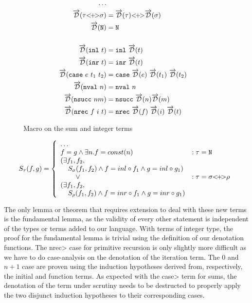   \begin{figure}
    \centering
    \begin{equation*}
      \begin{split}
        \dots \\
        \overrightarrow{\mathcal{D}}(\tau {<}\!{+}\!{>} \sigma) &= \overrightarrow{\mathcal{D}}(\tau) {<}\!{+}\!{>} \overrightarrow{\mathcal{D}}(\sigma) \\
        \overrightarrow{\mathcal{D}}(\texttt{N}) &= \texttt{N} \\ \\
        \overrightarrow{\mathcal{D}}(\texttt{inl}\ t) &= \texttt{inl}\ \overrightarrow{\mathcal{D}}(t) \\
        \overrightarrow{\mathcal{D}}(\texttt{inr}\ t) &= \texttt{inr}\ \overrightarrow{\mathcal{D}}(t) \\
        \overrightarrow{\mathcal{D}}(\texttt{case}\ e\ t_1\ t_2) &= \texttt{case}\ \overrightarrow{\mathcal{D}}(e)\ \overrightarrow{\mathcal{D}}(t_1)\ \overrightarrow{\mathcal{D}}(t_2) \\
        \overrightarrow{\mathcal{D}}(\texttt{nval}\ n) &= \texttt{nval}\ n \\
        \overrightarrow{\mathcal{D}}(\texttt{nsucc}\ n{m}) &= \texttt{nsucc}\ \overrightarrow{\mathcal{D}}(n){\overrightarrow{\mathcal{D}}(m)} \\
        \overrightarrow{\mathcal{D}}(\texttt{nrec}\ f\ i\ t) &= \texttt{nrec}\ \overrightarrow{\mathcal{D}}(f)\ \overrightarrow{\mathcal{D}}(i)\ \overrightarrow{\mathcal{D}}(t)
      \end{split}
    \end{equation*}
    \caption{Macro on the sum and integer terms}
    \label{eqn:macro_sums_prim}
  \end{figure}

  \begin{equation}
    S_\tau(f, g) =
      \left\{
        \begin{array}{ll}
          \dots \\
          f = g \wedge
            \exists n. f = const(n)
            & : \tau = \texttt{N} \\
          (\exists f_1, f_2, \\
            \;\;\;\;S_\sigma(f_1, f_2) \wedge f = inl \circ f_1 \wedge g = inl \circ g_1) \\
            \;\;\;\;\;\;\;\;\vee & : \tau = \sigma {<}\!{+}\!{>} \rho \\
          (\exists f_1, f_2,\\
            \;\;\;\;S_\rho(f_1, f_2) \wedge f = inr \circ f_1 \wedge g = inr \circ g_1) \\
        \end{array}
      \right.
  \label{eqn:lr_sums_prim}
  \end{equation}

  The only lemma or theorem that requires extension to deal with these new terms is the fundamental lemma, as the validity of every other statement is independent of the types or terms added to our language.
  With terms of integer type, the proof for the fundamental lemma is trivial using the definition of our denotation functions.
  The \<nrec> case for primitive recursion is only slightly more difficult as  we have to do case-analysis on the denotation of the iteration term.
  The $0$ and $n+1$ case are proven using the induction hypotheses derived from, respectively, the initial and function terms.
  As expected with the \<case> term for sums, the denotation of the term under scrutiny needs to be destructed to properly apply the two disjunct induction hypotheses to their corresponding cases.
